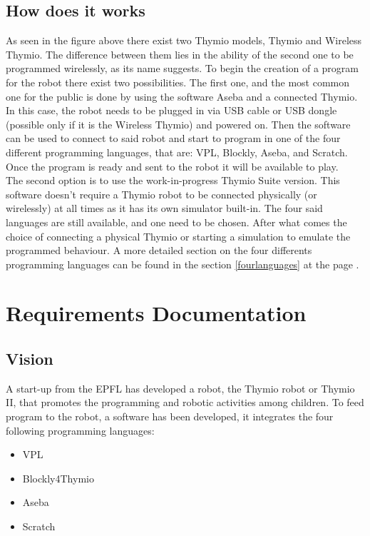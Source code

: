 \documentclass{scrbook}
\begin{document}
\section{How does it works \label{howdoesitworkref}} 

As seen in the figure above there exist two Thymio models, Thymio and Wireless Thymio. 
The difference between them lies in the ability of the second one to be programmed wirelessly, 
as its name suggests. To begin the creation of a program for the robot there exist two possibilities.
The first one, and the most common one for the public is done by using the software Aseba and a connected Thymio. 
In this case, the robot needs to be plugged in via USB cable or USB dongle (possible only if it is the Wireless Thymio) and powered on. 
Then the software can be used to connect to said robot and start to program in one of the four different programming languages, 
that are: VPL, Blockly, Aseba, and Scratch. Once the program is ready and sent to the robot it will be available to play. \\

The second option is to use the work-in-progress Thymio Suite version. 
This software doesn’t require a Thymio robot to be connected physically (or wirelessly) at all times as it has its own simulator built-in. 
The four said languages are still available, and one need to be chosen. 
After what comes the choice of connecting a physical Thymio or starting a simulation to emulate the programmed behaviour.
A more detailed section on the four differents programming languages can be found in the section \ref{fourlanguages} at the page \pageref{fourlanguages}.

\chapter{Requirements Documentation}
\section{Vision}

A start-up from the EPFL has developed a robot, the Thymio robot or Thymio II, that promotes the programming and robotic activities among children. 
To feed program to the robot, a software has been developed, it integrates the four following programming languages: 
\begin{itemize}
  \item VPL
  \item Blockly4Thymio
  \item Aseba
  \item Scratch
\end{itemize}
\end{document}
